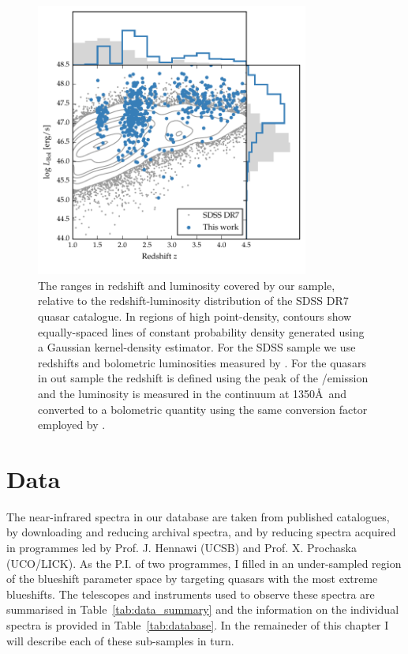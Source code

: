 \begin{figure}
    \includegraphics[width=0.8\textwidth]{figures/chapter02/luminosity_z.pdf} 
    \caption{The ranges in redshift and luminosity covered by our sample, relative to the redshift-luminosity distribution of the SDSS DR7 quasar catalogue. In regions of high point-density, contours show equally-spaced lines of constant probability density generated using a Gaussian kernel-density estimator. For the SDSS sample we use \citet{hewett10} redshifts and bolometric luminosities measured by \citet{shen11}. For the quasars in out sample the redshift is defined using the peak of the \hans/\hb emission and the luminosity is measured in the continuum at 1350\AA\, and converted to a bolometric quantity using the same conversion factor employed by \citet{shen11}. }     
    \label{fig:lzplane}
\end{figure}


\section{Data}

The near-infrared spectra in our database are taken from published catalogues, by downloading and reducing
archival spectra, and by reducing spectra acquired in programmes led by Prof. J. Hennawi (UCSB) and Prof. X. Prochaska (UCO/LICK). 
As the P.I. of two programmes, I filled in an under-sampled region of the  blueshift parameter space by targeting quasars with the most extreme  blueshifts.
The telescopes and instruments used to observe these spectra are summarised in Table~\ref{tab:data_summary} and the information on the individual spectra is provided in Table~\ref{tab:database}.
In the remaineder of this chapter I will describe each of these sub-samples in turn. 


